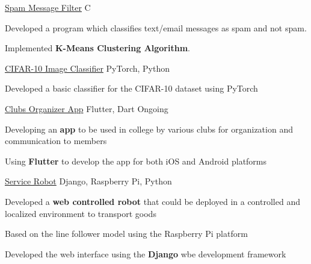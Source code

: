 \begin{cventries}
\projects
{} %
 {\href{}{Spam Message Filter}} %
 {C} %
 {} %
 {
   \begin{cvitems} %
     \item {Developed a program which classifies text/email messages as spam and not spam.}
     \item {Implemented \textbf{K-Means Clustering Algorithm}.}
   \end{cvitems}
 }

 \projects
{} %
 {\href{https://github.com/vinx-2105/CIFAR-10_Basic_Classifier}{CIFAR-10 Image Classifier}} %
 {PyTorch, Python} %
 {} %
 {
   \begin{cvitems} %
     \item {Developed a basic classifier for the CIFAR-10 dataset using PyTorch}
   \end{cvitems}
 }
  


\projects
{} %
 {\href{https://github.com/vinx-2105/clubs_organiser}{Clubs Organizer App}} %
 {Flutter, Dart} %
 {Ongoing} %
 {
   \begin{cvitems} %
     \item {Developing an \textbf{app} to be used in college by various clubs for organization and communication to members}
     \item {Using \textbf{Flutter} to develop the app for both iOS and Android platforms}
   \end{cvitems}
 }

\projects
   {} %
    {\href{https://github.com/vinx-2105/service_bot}{Service Robot}} %
    {Django, Raspberry Pi, Python} %
    {} %
    {
      \begin{cvitems} %
        \item {Developed a \textbf{web controlled robot} that could be deployed in a controlled and localized environment to transport goods}
        \item {Based on the line follower model using the Raspberry Pi platform}
        \item {Developed the web interface using the \textbf{Django} wbe development framework}
      \end{cvitems}
    }
  

\end{cventries}
